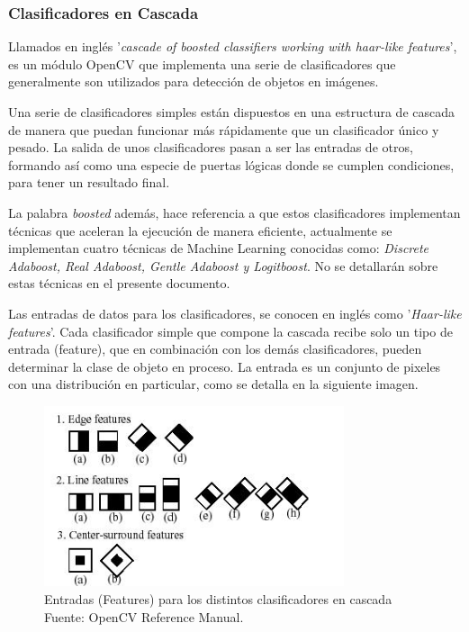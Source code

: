 \documentclass[a4paper,12pt,oneside,spanish]{book}
\begin{document}
\subsubsection{Clasificadores en Cascada}

Llamados en inglés '\textit{cascade of boosted classifiers working with haar-like features}', es un módulo OpenCV que implementa una serie de clasificadores que generalmente son utilizados para detección de objetos en imágenes. \par

Una serie de clasificadores simples están dispuestos en una estructura de cascada de manera que puedan funcionar más rápidamente que un clasificador único y pesado. La salida de unos clasificadores pasan a ser las entradas de otros, formando así como una especie de puertas lógicas donde se cumplen condiciones, para tener un resultado final. \par

La palabra \textit{boosted} además, hace referencia a que estos clasificadores implementan técnicas que aceleran la ejecución de manera eficiente, actualmente se implementan cuatro técnicas de Machine Learning conocidas como: \textit{Discrete Adaboost, Real Adaboost, Gentle Adaboost y Logitboost}. No se detallarán sobre estas técnicas en el presente documento.\par

Las entradas de datos para los clasificadores, se conocen en inglés como '\textit{Haar-like features}'. Cada clasificador simple que compone la cascada recibe solo un tipo de entrada (feature), que en combinación con los demás clasificadores, pueden determinar la clase de objeto en proceso. La entrada es un conjunto de pixeles con una distribución en particular, como se detalla en la siguiente imagen.\par

\begin{figure}[h!]
	\includegraphics[width=250pt]{Imagenes/haarlike.jpg}
	\centering
	\caption{Entradas (Features) para los distintos clasificadores en cascada Fuente: OpenCV Reference Manual.}
	\label{fig:haarlike1}
\end{figure}
\end{document}
